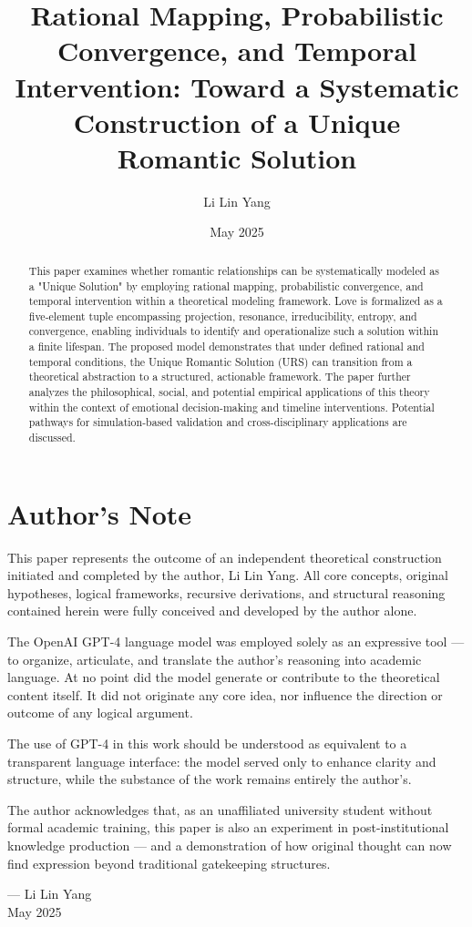 \documentclass{article}
\title{Rational Mapping, Probabilistic Convergence, and Temporal Intervention: Toward a Systematic Construction of a Unique Romantic Solution}
\author{Li Lin Yang}
\date{May 2025}
\begin{document}
\maketitle

\section*{Author’s Note}
This paper represents the outcome of an independent theoretical construction initiated and completed by the author, Li Lin Yang. All core concepts, original hypotheses, logical frameworks, recursive derivations, and structural reasoning contained herein were fully conceived and developed by the author alone.

The OpenAI GPT-4 language model was employed solely as an expressive tool — to organize, articulate, and translate the author's reasoning into academic language. At no point did the model generate or contribute to the theoretical content itself. It did not originate any core idea, nor influence the direction or outcome of any logical argument.

The use of GPT-4 in this work should be understood as equivalent to a transparent language interface: the model served only to enhance clarity and structure, while the substance of the work remains entirely the author’s.

The author acknowledges that, as an unaffiliated university student without formal academic training, this paper is also an experiment in post-institutional knowledge production — and a demonstration of how original thought can now find expression beyond traditional gatekeeping structures.

— Li Lin Yang\\
May 2025

\begin{abstract}
This paper examines whether romantic relationships can be systematically modeled as a "Unique Solution" by employing rational mapping, probabilistic convergence, and temporal intervention within a theoretical modeling framework. Love is formalized as a five-element tuple encompassing projection, resonance, irreducibility, entropy, and convergence, enabling individuals to identify and operationalize such a solution within a finite lifespan. The proposed model demonstrates that under defined rational and temporal conditions, the Unique Romantic Solution (URS) can transition from a theoretical abstraction to a structured, actionable framework. The paper further analyzes the philosophical, social, and potential empirical applications of this theory within the context of emotional decision-making and timeline interventions. Potential pathways for simulation-based validation and cross-disciplinary applications are discussed.
\end{abstract}
\end{document}
